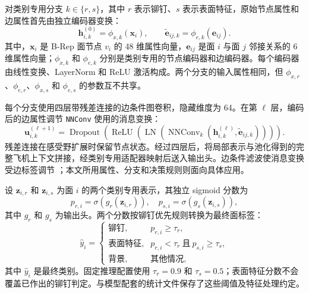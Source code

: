 \documentclass[12pt,a4paper]{ctexart}
\begin{document}
对类别专用分支 $k\in\{r,s\}$，其中 $r$ 表示铆钉、$s$ 表示表面特征，原始节点属性和边属性首先由独立编码器变换：
\begin{equation}
\mathbf{h}_{i,k}^{(0)}=\phi_{x,k}(\mathbf{x}_i), \qquad
\tilde{\mathbf{e}}_{ij,k}=\phi_{e,k}(\mathbf{e}_{ij}).
\label{eq:class_specific_input_encoding}
\end{equation}
其中，$\mathbf{x}_i$ 是 B-Rep 面节点 $v_i$ 的 48 维属性向量，$\mathbf{e}_{ij}$ 是面 $i$ 与面 $j$ 邻接关系的 6 维属性向量；$\phi_{x,k}$ 和 $\phi_{e,k}$ 分别是类别专用的节点编码器和边编码器。每个编码器由线性变换、LayerNorm 和 ReLU 激活构成。两个分支的输入属性相同，但 $\phi_{x,r}$、$\phi_{e,r}$、$\phi_{x,s}$ 和 $\phi_{e,s}$ 的参数互不共享。

每个分支使用四层带残差连接的边条件图卷积，隐藏维度为 64。在第 $\ell$ 层，编码后的边属性调节 \texttt{NNConv} 使用的消息变换：
\begin{equation}
\mathbf{u}_{i,k}^{(\ell+1)}=
\operatorname{Dropout}\!\left(
\operatorname{ReLU}\!\left(
\operatorname{LN}\!\left(
\operatorname{NNConv}_{k}
(\mathbf{h}_{i,k}^{(\ell)},\tilde{\mathbf{e}}_{ij,k})
\right)\right)\right).
\label{eq:class_specific_message_update}
\end{equation}
残差连接在感受野扩展时保留节点状态。经过四层后，将局部表示与池化得到的完整飞机上下文拼接，经类别专用适配器映射后送入输出头。边条件滤波使消息变换受边标签调节 \parencite{simonovsky2017dynamic}；本文所用属性、分支和决策规则则面向具体应用。

设 $\mathbf{z}_{i,r}$ 和 $\mathbf{z}_{i,s}$ 为面 $i$ 的两个类别专用表示，其独立 sigmoid 分数为
\begin{equation}
p_{r,i}=\sigma(g_r(\mathbf{z}_{i,r})), \quad
p_{s,i}=\sigma(g_s(\mathbf{z}_{i,s})),
\label{eq:class_specific_scores}
\end{equation}
其中 $g_r$ 和 $g_s$ 为输出头。两个分数按铆钉优先规则转换为最终面标签：
\begin{equation}
\hat{y}_i =
\begin{cases}
\text{铆钉}, & p_{r,i} \geq \tau_r, \\
\text{表面特征}, & p_{r,i} < \tau_r \ \text{且} \ p_{s,i} \geq \tau_s, \\
\text{背景}, & \text{其他情况},
\end{cases}
\label{eq:dual_head_decision}
\end{equation}
其中 $\hat{y}_i$ 是最终类别。固定推理配置使用 $\tau_r=0.9$ 和 $\tau_s=0.5$；表面特征分数不会覆盖已作出的铆钉判定。与模型配套的统计文件保存了这些阈值及特征处理约定。
\end{document}
